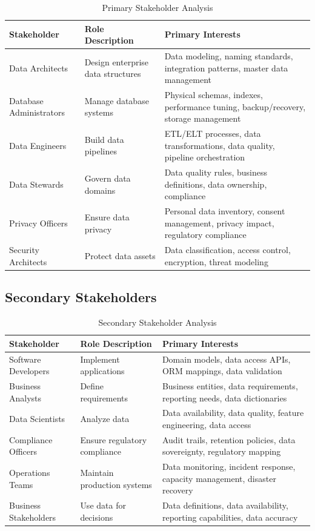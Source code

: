 \documentclass[11pt,letterpaper]{article}
\begin{document}
\begin{table}[H]
\centering
\caption{Primary Stakeholder Analysis}
\small
\begin{tabular}{@{}L{2.6cm}L{3.6cm}L{7cm}@{}}
\toprule
\textbf{Stakeholder} & \textbf{Role Description} & \textbf{Primary Interests} \\
\midrule
Data Architects & Design enterprise data structures & Data modeling, naming standards, integration patterns, master data management \\
\addlinespace
Database Administrators & Manage database systems & Physical schemas, indexes, performance tuning, backup/recovery, storage management \\
\addlinespace
Data Engineers & Build data pipelines & ETL/ELT processes, data transformations, data quality, pipeline orchestration \\
\addlinespace
Data Stewards & Govern data domains & Data quality rules, business definitions, data ownership, compliance \\
\addlinespace
Privacy Officers & Ensure data privacy & Personal data inventory, consent management, privacy impact, regulatory compliance \\
\addlinespace
Security Architects & Protect data assets & Data classification, access control, encryption, threat modeling \\
\bottomrule
\end{tabular}
\end{table}

\subsection{Secondary Stakeholders}

\begin{table}[H]
\centering
\caption{Secondary Stakeholder Analysis}
\small
\begin{tabular}{@{}L{2.6cm}L{3.6cm}L{7cm}@{}}
\toprule
\textbf{Stakeholder} & \textbf{Role Description} & \textbf{Primary Interests} \\
\midrule
Software Developers & Implement applications & Domain models, data access APIs, ORM mappings, data validation \\
\addlinespace
Business Analysts & Define requirements & Business entities, data requirements, reporting needs, data dictionaries \\
\addlinespace
Data Scientists & Analyze data & Data availability, data quality, feature engineering, data access \\
\addlinespace
Compliance Officers & Ensure regulatory compliance & Audit trails, retention policies, data sovereignty, regulatory mapping \\
\addlinespace
Operations Teams & Maintain production systems & Data monitoring, incident response, capacity management, disaster recovery \\
\addlinespace
Business Stakeholders & Use data for decisions & Data definitions, data availability, reporting capabilities, data accuracy \\
\bottomrule
\end{tabular}
\end{table}
\end{document}
